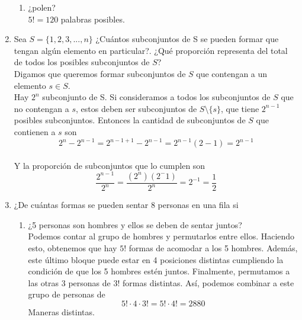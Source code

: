 \documentclass[12pt,a4paper]{report}
\begin{document}
\begin{enumerate}
{\begin{enumerate}[label=\alph*) ]
{	"esternocleidomastoideo" posee 22 letras. Si tomamos $22!$ tendríamos las combinaciones posibles, no obstante esto repitiría los casos con las letras que están más de una vez en la palabra. Entonces quedaría de la siguiente manera:\\ $\frac{22!}{4!2!2!4!2!2!}$ $\approx 1.21 \times 10^{17}$

   }

   \item {
   ¿polen?\\

	$5! = 120$ palabras posibles.
   }
	\end{enumerate}

	}

   \item {
    Sea $S = \{1, 2, 3, ... , n\}$ ¿Cuántos subconjuntos de S se pueden
    formar que tengan algún elemento en particular?. ¿Qué proporción
    representa del total de todos los posibles subconjuntos de $S$?\\

		Digamos que queremos formar subconjuntos de $S$ que contengan a un elemento
		$s \in S$.\\
		Hay $2^n$ subconjunto de S. Si consideramos a todos los subconjuntos de $S$ que no
		contengan a $s$, estos deben ser subconjuntos de $S \setminus \{s\}$, que tiene $2^{n-1}$
		posibles subconjuntos. Entonces la cantidad de subconjuntos de $S$ que
		contienen a $s$ son\\
		\begin{equation*}
			2^n - 2^{n-1} = 2^{n - 1 + 1} - 2^{n-1} = 2^{n-1}(2 - 1) = 2^{n-1}
		\end{equation*}\\
		Y la proporción de subconjuntos que lo cumplen son\\
		\begin{equation*}
			\frac{2^{n-1}}{2^n}	= \frac{(2^n) (2^-1)}{2^n} = 2^{-1} = \frac{1}{2}
		\end{equation*}
	}

   \item {
    ¿De cuántas formas se pueden sentar 8 personas en una fila si\\

	\begin{enumerate}[label=\alph*) ]
   \item {
   ¿5 personas son hombres y ellos se deben de sentar juntos?\\
   Podemos contar al grupo de hombres y permutarlos entre ellos. Haciendo esto, obtenemos que hay $5!$ formas de acomodar a los 5 hombres. Además, este último bloque puede estar en 4 posiciones distintas cumpliendo la condición de que los 5 hombres estén juntos. Finalmente, permutamos a las otras 3 personas de $3!$ formas distintas. Así, podemos combinar a este grupo de personas de $$5!\cdot 4 \cdot 3! = 5! \cdot 4! = 2880$$ Maneras distintas.

}
\end{enumerate}}
\end{enumerate}
\end{document}

